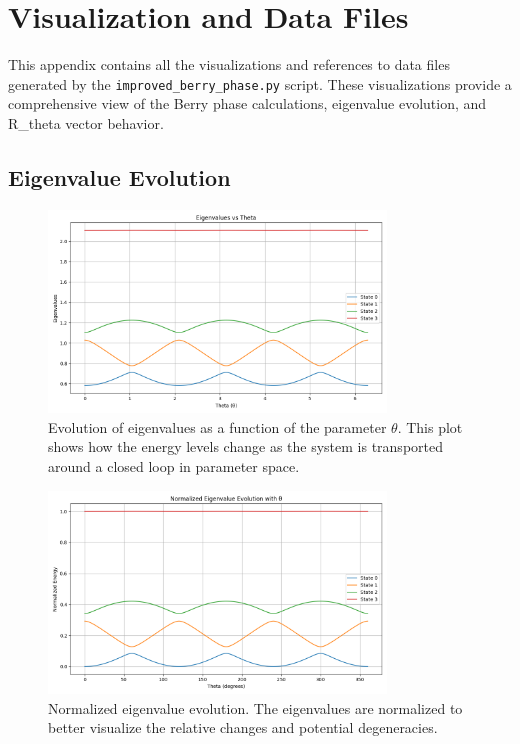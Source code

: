 \documentclass[12pt,a4paper]{article}
\begin{document}
\appendix
\section{Visualization and Data Files}\label{appendix:viz}

This appendix contains all the visualizations and references to data files generated by the \texttt{improved\_berry\_phase.py} script. These visualizations provide a comprehensive view of the Berry phase calculations, eigenvalue evolution, and R\_theta vector behavior.

\subsection{Eigenvalue Evolution}

\begin{figure}[H]
    \centering
    \includegraphics[width=0.8\textwidth]{improved_berry_phase_results/eigenvalue_evolution.png}
    \caption{Evolution of eigenvalues as a function of the parameter $\theta$. This plot shows how the energy levels change as the system is transported around a closed loop in parameter space.}
    \label{fig:eigenvalue_evolution}
\end{figure}

\begin{figure}[H]
    \centering
    \includegraphics[width=0.8\textwidth]{improved_berry_phase_results/normalized_eigenvalue_evolution.png}
    \caption{Normalized eigenvalue evolution. The eigenvalues are normalized to better visualize the relative changes and potential degeneracies.}
    \label{fig:normalized_eigenvalue_evolution}
\end{figure}
\end{document}
